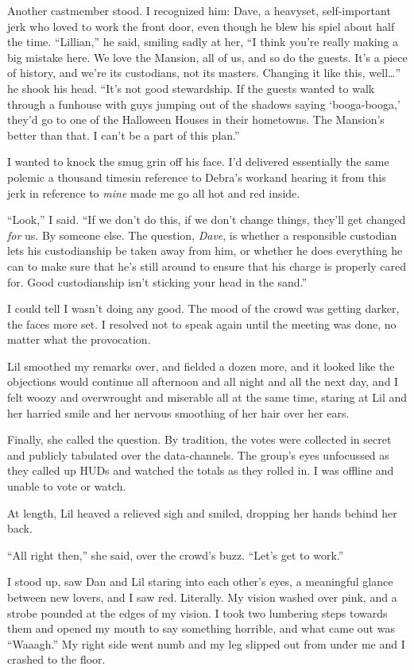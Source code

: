 Another castmember stood. I recognized him: Dave, a heavyset,
self-important jerk who loved to work the front door, even though
he blew his spiel about half the time. “Lillian,” he said, smiling
sadly at her, “I think you're really making a big mistake here. We
love the Mansion, all of us, and so do the guests. It's a piece of
history, and we're its custodians, not its masters. Changing it
like this, well…” he shook his head. “It's not good stewardship. If
the guests wanted to walk through a funhouse with guys jumping out
of the shadows saying ‘booga-booga,’ they'd go to one of the
Halloween Houses in their hometowns. The Mansion's better than
that. I can't be a part of this plan.”

I wanted to knock the smug grin off his face. I'd delivered
essentially the same polemic a thousand times{\dash}in reference to
Debra's work{\dash}and hearing it from this jerk in reference to
\emph{mine} made me go all hot and red inside.

“Look,” I said. “If we don't do this, if we don't change things,
they'll get changed \emph{for} us. By someone else. The question,
\emph{Dave}, is whether a responsible custodian lets his
custodianship be taken away from him, or whether he does everything
he can to make sure that he's still around to ensure that his
charge is properly cared for. Good custodianship isn't sticking
your head in the sand.”

I could tell I wasn't doing any good. The mood of the crowd was
getting darker, the faces more set. I resolved not to speak again
until the meeting was done, no matter what the provocation.

Lil smoothed my remarks over, and fielded a dozen more, and it
looked like the objections would continue all afternoon and all
night and all the next day, and I felt woozy and overwrought and
miserable all at the same time, staring at Lil and her harried
smile and her nervous smoothing of her hair over her ears.

Finally, she called the question. By tradition, the votes were
collected in secret and publicly tabulated over the data-channels.
The group's eyes unfocussed as they called up HUDs and watched the
totals as they rolled in. I was offline and unable to vote or
watch.

At length, Lil heaved a relieved sigh and smiled, dropping her
hands behind her back.

“All right then,” she said, over the crowd's buzz. “Let's get to
work.”

I stood up, saw Dan and Lil staring into each other's eyes, a
meaningful glance between new lovers, and I saw red. Literally. My
vision washed over pink, and a strobe pounded at the edges of my
vision. I took two lumbering steps towards them and opened my mouth
to say something horrible, and what came out was “Waaagh.” My right
side went numb and my leg slipped out from under me and I crashed
to the floor.

